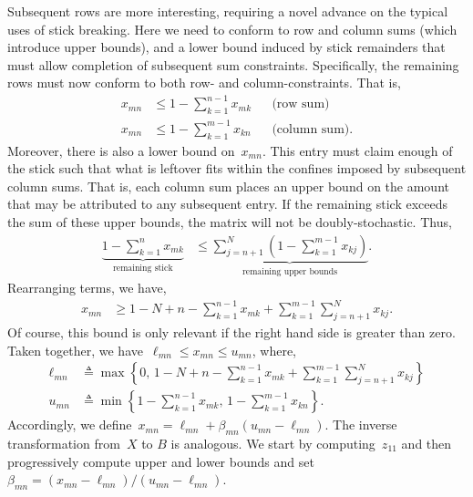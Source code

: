 \documentclass[twoside]{article}
\begin{document}
Subsequent rows are more interesting, requiring a novel advance on the
typical uses of stick breaking. Here we need to conform to row and
column sums (which introduce upper bounds), and a lower bound
induced by stick remainders that must allow completion of subsequent
sum constraints.  Specifically, the remaining rows must now conform to
both row- and column-constraints. That is,
\begin{align*}
x_{mn} &\leq 1- \sum_{k=1}^{n-1} x_{mk} & & \text{(row sum)} \\
x_{mn} &\leq 1- \sum_{k=1}^{m-1} x_{kn} & & \text{(column sum)}.
\end{align*}
Moreover, there is also a lower bound on~$x_{mn}$. This entry must
claim enough of the stick such that what is leftover fits within
the confines imposed by subsequent column sums. That is, each column
sum places an upper bound on the amount that may be attributed to any
subsequent entry. If the remaining stick exceeds the sum of these
upper bounds, the matrix will not be doubly-stochastic.  Thus,
\begin{align*}
\underbrace{1 - \sum_{k=1}^n x_{mk}}_{\text{remaining stick}}
  &\leq \underbrace{\sum_{j=n+1}^N (1- \sum_{k=1}^{m-1} x_{kj})}_{
    \text{remaining upper bounds}}.
\end{align*}
Rearranging terms, we have,
\begin{align*}
  x_{mn} &\geq
1 - N + n - \sum_{k=1}^{n-1} x_{mk}  +  \sum_{k=1}^{m-1} \sum_{j=n+1}^N x_{kj}.
\end{align*}
Of course, this bound is only relevant if the right hand side is greater than zero.
Taken together, we have~$\ell_{mn} \leq x_{mn} \leq u_{mn}$, where,
\begin{align*}
\ell_{mn} &\triangleq \max \left \{0, \, 1 - N + n - \sum_{k=1}^{n-1} x_{mk}  +  \sum_{k=1}^{m-1} \sum_{j=n+1}^N x_{kj} \right \}
\\
u_{mn} &\triangleq 
\min \left \{1- \sum_{k=1}^{n-1} x_{mk}, \,
1- \sum_{k=1}^{m-1} x_{kn} \right\}.
\end{align*}
Accordingly, we define~${x_{mn} = \ell_{mn} + \beta_{mn} (u_{mn} - \ell_{mn})}$.
The inverse transformation from~$X$ to $B$ is analogous.
We start by computing~$z_{11}$ and then progressively compute
upper and lower bounds and set~${\beta_{mn} = (x_{mn} - \ell_{mn})/(u_{mn} - \ell_{mn})}$.
\end{document}
